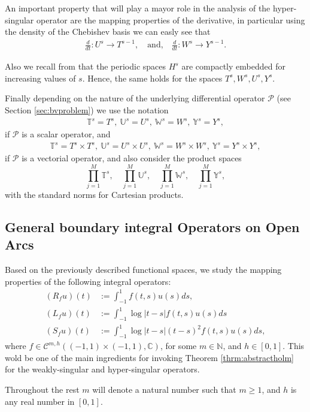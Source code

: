 \documentclass{article}
\newcommand{\IC}{{\mathbb C}}
\newcommand{\IN}{{\mathbb N}}
\newcommand{\IU}{{\mathbb U}}
\newcommand{\IT}{{\mathbb T}}
\newcommand{\IW}{{\mathbb W}}
\newcommand{\IY}{{\mathbb Y}}
\newcommand{\cmspaceh}[4]{\mathcal{C}^{#1,#2} \left( #3, #4 \right)}
\newcommand{\cP}{\mathcal{P}}
\begin{document}
An important property that will play a mayor role in the analysis of the hyper-singular operator are the mapping properties of the derivative, in particular using the density of the Chebishev basis we can easly see that 
\begin{align}
\label{eq:devprop}
\frac{d}{dt} : U^s \rightarrow T^{s-1}, \quad \text{and,} \quad 
\frac{d}{dt} : W^s \rightarrow Y^{s-1}.
\end{align}

Also we recall from \cite[Lemma 5.3.2]{saranen2013periodic} that the periodic spaces $H^s$ are compactly embedded for increasing values of $s$. Hence, the same holds for the spaces $T^s,W^s,U^s,Y^s$.

Finally depending on the nature of the underlying differential operator $\cP$ (see Section \ref{sec:bvproblem}) we use the notation 
\begin{align*}
\IT^s = T^s,\ \IU^s = U^s, \ \IW^s = W^s, \ \IY^s = Y^s,
\end{align*}
if $\cP$ is a scalar operator, and 
\begin{align*}
\IT^s = T^s \times T^s,\ \IU^s = U^s \times U^s, \ \IW^s = W^s \times W^s, \ \IY^s = Y^s \times Y^s,
\end{align*}
if $\cP$ is a vectorial operator, and also consider the product spaces 
$$
\prod_{j=1}^M \IT^s, \quad \prod_{j=1}^M \IU^s,  \quad \prod_{j=1}^M \IW^s, \quad \prod_{j=1}^M \IY^s,
$$
with the standard norms for Cartesian products.
\subsection{General boundary integral Operators on Open Arcs}
\label{sec:generalbio}

Based on the previously described functional spaces, we study the mapping properties of the following integral operators:
\begin{align*}
(R_f u)(t) &:= \int_{-1}^1f(t,s) u(s) ds,\\
(L_fu)(t) &:= \int_{-1}^1 \log|t-s| f(t,s) u(s) ds\\
(S_f u)(t) &:= \int_{-1}^1 \log|t-s| (t-s)^2 f(t,s)u(s)ds,
\end{align*}
where $f \in \cmspaceh{m}{h}{(-1,1)\times(-1,1)}{\IC}$, for some $m \in \IN$, and $h \in [0,1]$. This wold be one of the main ingredients for invoking Theorem \ref{thrm:abstractholm} for the weakly-singular and hyper-singular operators.

Throughout the rest $m$ will denote a natural number such that $m \geq 1$, and $h$ is any real number in $[0,1]$.
\end{document}
